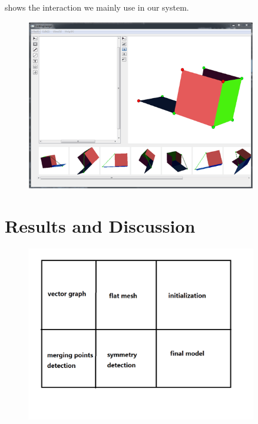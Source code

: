 \documentclass[submission]{gmp2018}
\begin{document}
{ shows the interaction we mainly use in our system.}

\begin{figure}
	\centering
	\includegraphics[width=0.9\textwidth]{images/ui.png}
	\caption{}
	\label{fig:interface}
\end{figure}


\section{Results and Discussion}\label{sec:result}
{}


\begin{figure}
	\centering
	\includegraphics[width=0.9\textwidth]{images/result.png}
	\caption{}
	\label{fig:result}
\end{figure}
\end{document}

